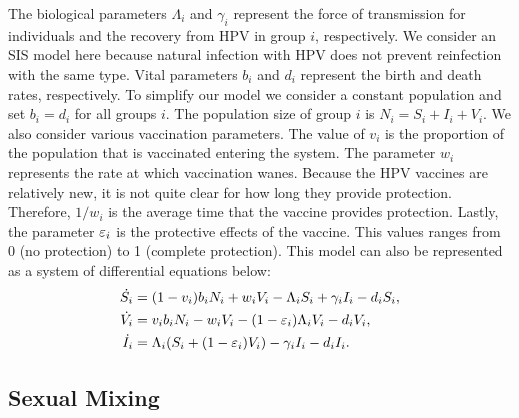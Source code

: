 \documentclass[12pt]{article}
\begin{document}
The biological parameters $\Lambda_i$ and $\gamma_i$ represent the force of transmission for individuals and the recovery from HPV in group $i$, respectively.  We consider an SIS model here because natural infection with HPV does not prevent reinfection with the same type.  Vital parameters $b_i$ and $d_i$ represent the birth and death rates, respectively.  To simplify our model we consider a constant population and set $b_i=d_i$ for all groups $i$.  The population size of group $i$ is $N_i=S_i+I_i+V_i$.  We also consider various vaccination parameters.  The value of $v_i$ is the proportion of the population that is vaccinated entering the system.  The parameter $w_i$ represents the rate at which vaccination wanes.  Because the HPV vaccines are relatively new, it is not quite clear for how long they provide protection.  Therefore, $1/w_i$ is the average time that the vaccine provides protection.  Lastly, the parameter $\varepsilon_i$ is the protective effects of the vaccine. This values ranges from 0 (no protection) to 1 (complete protection).  This model can also be represented as a system of differential equations below:
\begin{subequations}
\begin{align}
\dot{S_i} &= (1-v_i)b_iN_i + w_iV_i - \Lambda_iS_i + \gamma_i I_i - d_iS_i,\\
\dot{V_i} &= v_ib_iN_i - w_iV_i - (1-\varepsilon_i)\Lambda_iV_i  - d_iV_i,\\
\dot{I_i} &=  \Lambda_i(S_i+(1-\varepsilon_i)V_i) - \gamma_i I_i - d_iI_i.\end{align}
\end{subequations}


\subsection{Sexual Mixing}
\end{document}
